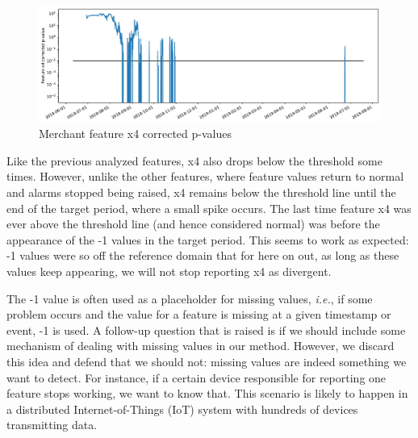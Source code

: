 \begin{figure}[!htb]
    \begin{center}
      \includegraphics[scale=0.5]{figures/merchant-x4-correctedpvalues.pdf}
      \caption{Merchant feature x4 corrected p-values}
      \label{fig:merchant-x4-correctedpvalues}
    \end{center}
\end{figure}
Like the previous analyzed features, x4 also drops below the threshold some times. However, unlike the other features, where feature values return to normal and alarms stopped being raised, x4 remains below the threshold line until the end of the target period, where a small spike occurs. The last time feature x4 was ever above the threshold line (and hence considered normal) was before the appearance of the -1 values in the target period. This seems to work as expected: -1 values were so off the reference domain that for here on out, as long as these values keep appearing, we will not stop reporting x4 as divergent.

The -1 value is often used as a placeholder for missing values, \textit{i.e.}, if some problem occurs and the value for a feature is missing at a given timestamp or event, -1 is used. A follow-up question that is raised is if we should include some mechanism of dealing with missing values in our method. However, we discard this idea and defend that we should not: missing values are indeed something we want to detect. For instance, if a certain device responsible for reporting one feature stops working, we want to know that. This scenario is likely to happen in a distributed Internet-of-Things (IoT) system with hundreds of devices transmitting data. 

